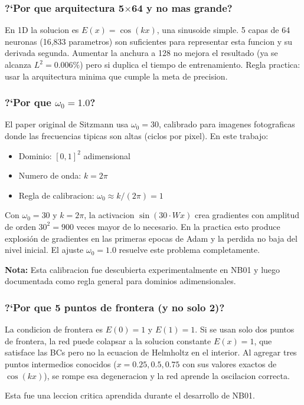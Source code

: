 \vspace{6pt}

\subsubsection*{?`Por que arquitectura 5$\times$64 y no mas grande?}
\begin{tcolorbox}[colback=gray!5, colframe=ujatgray, breakable]
En 1D la solucion es $E(x) = \cos(kx)$, una sinusoide simple. 5 capas de 64 neuronas
(16,833 parametros) son suficientes para representar esta funcion y su derivada segunda.
Aumentar la anchura a 128 no mejora el resultado (ya se alcanza $L^2 = 0.006\%$) pero
si duplica el tiempo de entrenamiento. Regla practica: usar la arquitectura minima que
cumple la meta de precision.
\end{tcolorbox}

\subsubsection*{?`Por que $\omega_0 = 1.0$?}
\begin{tcolorbox}[colback=gray!5, colframe=ujatgray, breakable]
El paper original de Sitzmann usa $\omega_0 = 30$, calibrado para imagenes fotograficas
donde las frecuencias tipicas son altas (ciclos por pixel). En este trabajo:
\begin{itemize}
  \item Dominio: $[0,1]^2$ adimensional
  \item Numero de onda: $k = 2\pi$
  \item Regla de calibracion: $\omega_0 \approx k/(2\pi) = 1$
\end{itemize}

Con $\omega_0 = 30$ y $k = 2\pi$, la activacion $\sin(30 \cdot Wx)$ crea gradientes
con amplitud de orden $30^2 = 900$ veces mayor de lo necesario. En la practica esto
produce explosión de gradientes en las primeras epocas de Adam y la perdida no baja
del nivel inicial. El ajuste $\omega_0 = 1.0$ resuelve este problema completamente.

\textbf{Nota:} Esta calibracion fue descubierta experimentalmente en NB01 y luego
documentada como regla general para dominios adimensionales.
\end{tcolorbox}

\subsubsection*{?`Por que 5 puntos de frontera (y no solo 2)?}
\begin{tcolorbox}[colback=gray!5, colframe=ujatgray, breakable]
La condicion de frontera es $E(0) = 1$ y $E(1) = 1$. Si se usan solo dos puntos
de frontera, la red puede colapsar a la solucion constante $E(x) = 1$, que satisface
las BCs pero no la ecuacion de Helmholtz en el interior. Al agregar tres puntos
intermedios conocidos ($x = 0.25, 0.5, 0.75$ con sus valores exactos de $\cos(kx)$),
se rompe esa degeneracion y la red aprende la oscilacion correcta.

Esta fue una leccion critica aprendida durante el desarrollo de NB01.
\end{tcolorbox}

